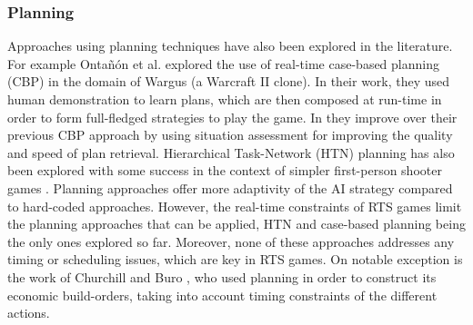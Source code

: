\documentclass{llncs}
\begin{document}


\subsubsection*{Planning}
Approaches using  planning techniques have  also been explored  in the
literature.  For example  Onta\~{n}\'{o}n  et al.  \cite{CBR_Planning}
explored the use of real-time  case-based planning (CBP) in the domain
of  Wargus (a  Warcraft  II clone).  In their  work,  they used  human
demonstration to learn  plans, which are then composed  at run-time in
order  to   form  full-fledged  strategies   to  play  the   game.  In
\cite{PlanRetrieval} they improve over  their previous CBP approach by
using situation assessment for improving the quality and speed of plan
retrieval.  Hierarchical Task-Network  (HTN)  planning  has also  been
explored  with some  success in  the context  of simpler  first-person
shooter  games  \cite{HTNPlanning}.  Planning  approaches  offer  more
adaptivity    of   the    AI   strategy    compared   to    hard-coded
approaches. However, the real-time constraints  of RTS games limit the
planning approaches that  can be applied, HTN  and case-based planning
being  the  only  ones  explored  so  far.  Moreover,  none  of  these
approaches addresses any timing or scheduling issues, which are key in
RTS games.  On notable  exception is  the work  of Churchill  and Buro
\cite{churchill2011build}, who used planning in order to construct its
economic build-orders,  taking into account timing  constraints of the
different actions.

\end{document}
